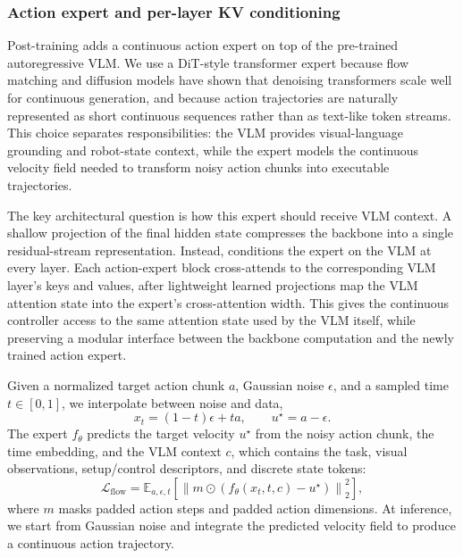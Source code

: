 \subsubsection{Action expert and per-layer KV conditioning}
\label{sec:posttraining-action-expert}

Post-training adds a continuous action expert on top of the pre-trained autoregressive VLM. We use a DiT-style transformer expert because flow matching and diffusion models have shown that denoising transformers scale well for continuous generation, and because action trajectories are naturally represented as short continuous sequences rather than as text-like token streams. This choice separates responsibilities: the VLM provides visual-language grounding and robot-state context, while the expert models the continuous velocity field needed to transform noisy action chunks into executable trajectories.

The key architectural question is how this expert should receive VLM context. A shallow projection of the final hidden state compresses the backbone into a single residual-stream representation. Instead, \molmoactt conditions the expert on the VLM at every layer. Each action-expert block cross-attends to the corresponding VLM layer's keys and values, after lightweight learned projections map the VLM attention state into the expert's cross-attention width. This gives the continuous controller access to the same attention state used by the VLM itself, while preserving a modular interface between the backbone computation and the newly trained action expert.

Given a normalized target action chunk \(a\), Gaussian noise \(\epsilon\), and a sampled time \(t \in [0,1]\), we interpolate between noise and data,
\begin{equation}
    x_t = (1-t)\epsilon + t a,
    \qquad
    u^\star = a - \epsilon.
\end{equation}
The expert \(f_\theta\) predicts the target velocity \(u^\star\) from the noisy action chunk, the time embedding, and the VLM context \(c\), which contains the task, visual observations, setup/control descriptors, and discrete state tokens:
\begin{equation}
    \mathcal{L}_{\mathrm{flow}}
    =
    \mathbb{E}_{a,\epsilon,t}
    \left[
    \left\|
    m \odot \left(f_\theta(x_t,t,c) - u^\star\right)
    \right\|_2^2
    \right],
\end{equation}
where \(m\) masks padded action steps and padded action dimensions. At inference, we start from Gaussian noise and integrate the predicted velocity field to produce a continuous action trajectory.

